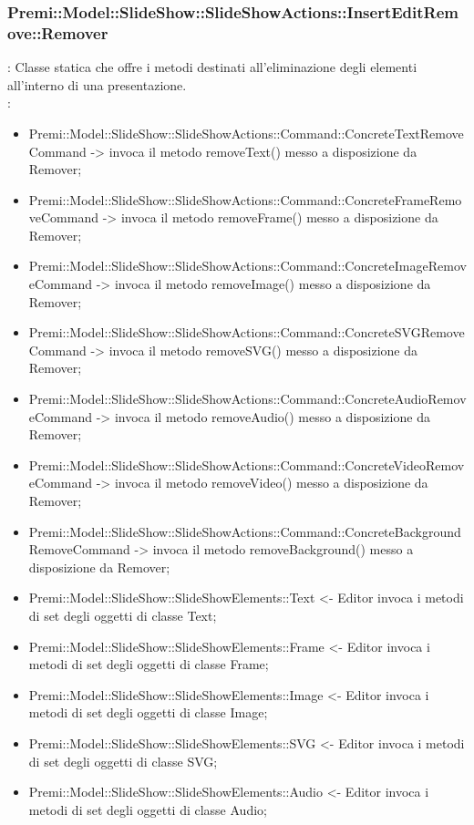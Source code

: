 {	\subsubsection{Premi::Model::SlideShow::SlideShowActions::InsertEditRemove::Remover}{
		\textbf{\tipo}: Classe statica che offre i metodi destinati all'eliminazione degli elementi all’interno di una presentazione.\\	
		\textbf{\relaz}:
		\begin{itemize}
			\item Premi::Model::SlideShow::SlideShowActions::Command::ConcreteTextRemoveCommand -> invoca il metodo removeText() messo a disposizione da Remover;
			\item Premi::Model::SlideShow::SlideShowActions::Command::ConcreteFrameRemoveCommand -> invoca il metodo removeFrame() messo a disposizione da Remover;
			\item Premi::Model::SlideShow::SlideShowActions::Command::ConcreteImageRemoveCommand -> invoca il metodo removeImage() messo a disposizione da Remover;
			\item Premi::Model::SlideShow::SlideShowActions::Command::ConcreteSVGRemoveCommand -> invoca il metodo removeSVG() messo a disposizione da Remover;
			\item Premi::Model::SlideShow::SlideShowActions::Command::ConcreteAudioRemoveCommand -> invoca il metodo removeAudio() messo a disposizione da Remover;
			\item Premi::Model::SlideShow::SlideShowActions::Command::ConcreteVideoRemoveCommand -> invoca il metodo removeVideo() messo a disposizione da Remover;
			\item Premi::Model::SlideShow::SlideShowActions::Command::ConcreteBackgroundRemoveCommand -> invoca il metodo removeBackground() messo a disposizione da Remover;
           \item Premi::Model::SlideShow::SlideShowElements::Text <- Editor invoca i metodi di set degli oggetti di classe Text;
           \item Premi::Model::SlideShow::SlideShowElements::Frame <- Editor invoca i metodi di set degli oggetti di classe Frame;
           \item Premi::Model::SlideShow::SlideShowElements::Image <- Editor invoca i metodi di set degli oggetti di classe Image;
           \item Premi::Model::SlideShow::SlideShowElements::SVG <- Editor invoca i metodi di set degli oggetti di classe SVG;
           \item Premi::Model::SlideShow::SlideShowElements::Audio <- Editor invoca i metodi di set degli oggetti di classe Audio;

\end{itemize}}}
